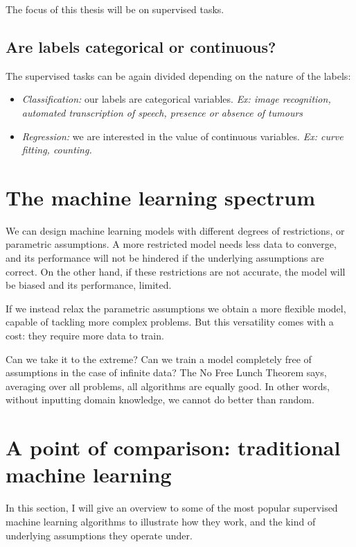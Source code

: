 The focus of this thesis will be on supervised tasks.

\subsection{Are labels categorical or continuous?}
The supervised tasks can be again divided depending on the nature of the labels:
\begin{itemize}
\item \emph{Classification:} our labels are categorical variables. \emph{Ex: image recognition, automated transcription of speech, presence or absence of tumours}
\item \emph{Regression:} we are interested in the value of continuous variables. \emph{Ex: curve fitting, counting.}
\end{itemize}

\section{The machine learning spectrum}
We can design machine learning models with different degrees of restrictions, or parametric assumptions.
A more restricted model needs less data to converge, and its performance will not be hindered if the underlying assumptions are correct.
On the other hand, if these restrictions are not accurate, the model will be biased and its performance, limited.

If we instead relax the parametric assumptions we obtain a more flexible model, capable of tackling more complex problems.
But this versatility comes with a cost: they require more data to train.


Can we take it to the extreme?
Can we train a model completely free  of assumptions in the case of infinite data? The No Free Lunch Theorem \citep{no_free_lunch} says, averaging over all problems, all algorithms are equally good.
In other words, without inputting domain knowledge, we cannot do better than random.

\section{A point of comparison: traditional machine learning}
In this section, I will give an overview to some of the most popular supervised machine learning algorithms to illustrate how they work, and the kind of underlying assumptions they operate under.

